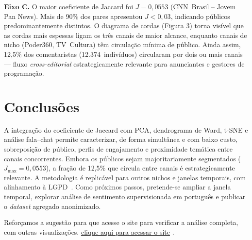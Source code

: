 \documentclass[a4,11pt]{wmecai}
\begin{document}
\textbf{Eixo C.}
O maior coeficiente de Jaccard foi $J=0{,}0553$ (CNN~Brasil --
Jovem Pan News). Mais de 90\% dos pares apresentou $J<0{,}03$,
indicando públicos predominantemente distintos.
O diagrama de cordas (Figura 3) torna visível que as cordas
mais espessas ligam os três canais de maior alcance, enquanto canais de
nicho (Poder360, TV~Cultura) têm circulação mínima de público.
Ainda assim, 12,5\% dos comentaristas (12.374~indivíduos) circularam
por dois ou mais canais --- fluxo \textit{cross-editorial} estrategicamente
relevante para anunciantes e gestores de programação.

\section{Conclusões}

A integração do coeficiente de Jaccard com PCA, dendrograma de Ward,
t-SNE e análise fala--chat permite caracterizar, de forma simultânea e
com baixo custo, sobreposição de público, perfis de engajamento e
proximidade temática entre canais concorrentes. Embora os públicos sejam
majoritariamente segmentados ($J_{\max}=0{,}0553$), a fração de 12,5\%
que circula entre canais é estrategicamente relevante. A metodologia é
replicável para outros nichos e janelas temporais, com alinhamento à
LGPD~\cite{LGPD2018}. Como próximos passos, pretende-se ampliar a janela
temporal, explorar análise de sentimento supervisionada em português e
publicar o \textit{dataset} agregado anonimizado.

Reforçamos a sugestão para que acesse o site para verificar a análise completa, com outras visualizações. \href{https://wsoaresjr.github.io/MAI5017-Visualizacao-da-Informacao}{clique aqui para acessar o site} .
\end{document}
